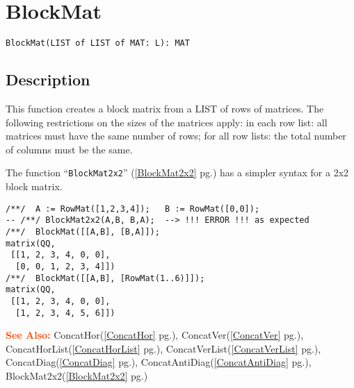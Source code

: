\documentclass[a4paper]{mybook}
\newenvironment{command}{}{} %
\newcommand\SeeAlso{\par\textcolor{OrangeRed}{\textbf{\large See Also: }}}
\begin{document}
\section{BlockMat}
\label{BlockMat}
\begin{command} %


\begin{Verbatim}[label=syntax, rulecolor=\color{MidnightBlue},
frame=single]
BlockMat(LIST of LIST of MAT: L): MAT
\end{Verbatim}


\subsection*{Description}

This function creates a block matrix from a LIST of rows of matrices.
The following restrictions on the sizes of the matrices apply:
  in each row list: all matrices must have the same number of rows;
  for all row lists: the total number of columns must be the same.
\par 
The function ``\verb&BlockMat2x2&'' (\ref{BlockMat2x2} pg.\pageref{BlockMat2x2}) has a simpler syntax for a
2x2 block matrix.
\begin{Verbatim}[label=example, rulecolor=\color{PineGreen}, frame=single]
/**/  A := RowMat([1,2,3,4]);   B := RowMat([0,0]);
-- /**/ BlockMat2x2(A,B, B,A);  --> !!! ERROR !!! as expected
/**/  BlockMat([[A,B], [B,A]]);
matrix(QQ,
 [[1, 2, 3, 4, 0, 0],
  [0, 0, 1, 2, 3, 4]])
/**/  BlockMat([[A,B], [RowMat(1..6)]]);
matrix(QQ,
 [[1, 2, 3, 4, 0, 0],
  [1, 2, 3, 4, 5, 6]])
\end{Verbatim}


\SeeAlso %
  ConcatHor(\ref{ConcatHor} pg.\pageref{ConcatHor}), 
    ConcatVer(\ref{ConcatVer} pg.\pageref{ConcatVer}), 
    ConcatHorList(\ref{ConcatHorList} pg.\pageref{ConcatHorList}), 
    ConcatVerList(\ref{ConcatVerList} pg.\pageref{ConcatVerList}), 
    ConcatDiag(\ref{ConcatDiag} pg.\pageref{ConcatDiag}), 
    ConcatAntiDiag(\ref{ConcatAntiDiag} pg.\pageref{ConcatAntiDiag}), 
    BlockMat2x2(\ref{BlockMat2x2} pg.\pageref{BlockMat2x2})
\end{command} %
\end{document}
